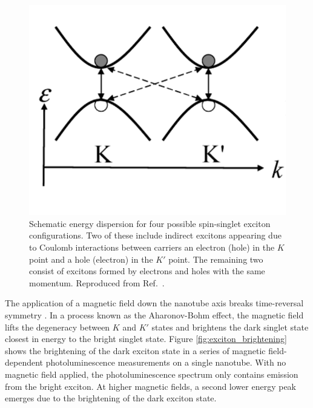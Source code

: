 \begin{figure}[ht]
	\centering
	\includegraphics[scale=0.4]{images/chapter_optical_props/exciton_schematic_srivastava}
	\caption{Schematic energy dispersion for four possible spin-singlet exciton configurations. Two of these include indirect excitons appearing due to Coulomb interactions between carriers an electron (hole) in the $K$ point and a hole (electron) in the $K'$ point. The remaining two consist of excitons formed by electrons and holes with the same momentum. Reproduced from Ref.\ \cite{srivastava2008direct}.}
	\label{fig:exciton_transitions}
\end{figure}

The application of a magnetic field down the nanotube axis breaks time-reversal symmetry \cite{srivastava2008direct}. In a process known as the Aharonov-Bohm effect, the magnetic field lifts the degeneracy between $K$ and $K'$ states and brightens the dark singlet state closest in energy to the bright singlet state. Figure \ref{fig:exciton_brightening} shows the brightening of the dark exciton state in a series of magnetic field-dependent photoluminescence measurements on a single nanotube. With no magnetic field applied, the photoluminescence spectrum only contains emission from the bright exciton. At higher magnetic fields, a second lower energy peak emerges due to the brightening of the dark exciton state.

